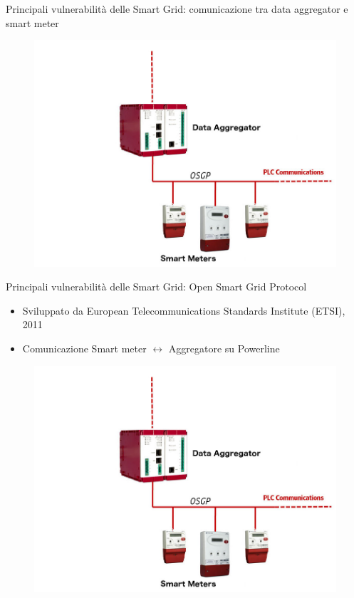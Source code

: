 \begin{frame}{Principali vulnerabilità delle Smart Grid: comunicazione tra data aggregator e smart meter}
	\begin{figure}[h] 
		\includegraphics[scale=0.3,cfbox=blue_slides 1pt 0pt]{imgs/aggregator.jpg}
	\end{figure}
\end{frame}

\begin{frame}{Principali vulnerabilità delle Smart Grid: Open Smart Grid Protocol}
	\begin{itemize}[<+- | alert@+>]
		\item Sviluppato da European Telecommunications Standards Institute (ETSI), 2011
		\item Comunicazione Smart meter $\leftrightarrow$ Aggregatore su Powerline
	\end{itemize}
	\begin{figure}[h] 
		\includegraphics[scale=0.15,cfbox=blue_slides 1pt 0pt]{imgs/aggregator.jpg}
	\end{figure}
\end{frame}

